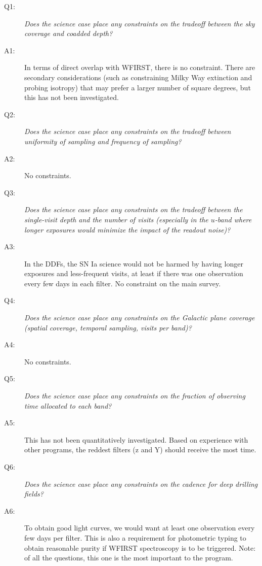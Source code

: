 \begin{description}

\item[Q1:] {\it Does the science case place any constraints on the
tradeoff between the sky coverage and coadded depth?}

\item[A1:] In terms of direct overlap with WFIRST, there is no constraint. There are secondary considerations (such as constraining  Milky Way extinction and probing isotropy) that may prefer a larger number of square degrees, but this has not been investigated.

\item[Q2:] {\it Does the science case place any constraints on the
tradeoff between uniformity of sampling and frequency of sampling?}

\item[A2:] No constraints.

\item[Q3:] {\it Does the science case place any constraints on the
tradeoff between the single-visit depth and the number of visits
(especially in the $u$-band where longer exposures would minimize the
impact of the readout noise)?}

\item[A3:] In the DDFs, the SN Ia science would not be harmed by having longer exposures and less-frequent visits, at least if there was one observation every few days in each filter. No constraint on the main survey.

\item[Q4:] {\it Does the science case place any constraints on the
Galactic plane coverage (spatial coverage, temporal sampling, visits per
band)?}

\item[A4:] No constraints.

\item[Q5:] {\it Does the science case place any constraints on the
fraction of observing time allocated to each band?}

\item[A5:] This has not been quantitatively investigated. Based on experience with other programs, the reddest filters (z and Y) should receive the most time.

\item[Q6:] {\it Does the science case place any constraints on the
cadence for deep drilling fields?}

\item[A6:] To obtain good light curves, we would want at least one observation every few days per filter. This is also a requirement for photometric typing to obtain reasonable purity if WFIRST spectroscopy is to be triggered. Note: of all the questions, this one is the most important to the program.


\end{description}
